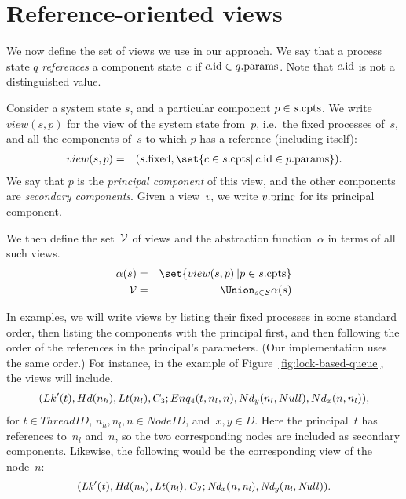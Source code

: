 \section{Reference-oriented views}
\label{sec:views}

We now define the set of views we use in our approach.  We say that a process
state $q$ \emph{references} a component state~$c$ if $c.\mathrm{id} \in q.\mathrm{params}$.
Note that $c.\mathrm{id}$ is not a distinguished value.

Consider a system state $s$, and a particular component $p \in s.\mathrm{cpts}$.  We
write $view(s, p)$ for the view of the system state from~$p$, i.e.~the
fixed processes of~$s$, and all the components of~$s$ to which $p$ has a
reference (including itself):
%
%
\begin{eqnarray*}
view(s, p) & = &
  (s.\fixed, \set{c \in s.\cpts \| c.\id \in p.\params}).
\end{eqnarray*}
%
We say that $p$ is the \emph{principal component} of this view, and the
other components are \emph{secondary components}.  Given a view~$v$, we write
$v.\mathrm{princ}$ for its principal component. 

We then define the set~$\mathcal{V}$ of views and the abstraction function~$\alpha$ in
terms of all such views.
%
\begin{eqnarray*}
\alpha(s) & = & \set{ view(s, p) \| p \in s.\cpts } \\
\V & = & \textstyle\Union_{s \in \S} \alpha(s)
\end{eqnarray*}

In examples, we will write views by listing their fixed processes in some
standard order, then listing the components with the principal first, and then
following the order of the references in the principal's parameters.  (Our
implementation uses the same order.)  For instance, in the example of
Figure~\ref{fig:lock-based-queue}, the views will include,
\[
\begin{align}
(Lk'(t), Hd(n_h), Lt(n_l), C_3; 
  Enq_4(t, n_l, n), Nd_y(n_l, Null),Nd_x(n, n_l)),
\end{align}
\]
for $t \in ThreadID$, $n_h, n_l, n \in NodeID$, and~$x, y \in D$.  Here the
principal~$t$ has references to~$n_l$ and~$n$, so the two corresponding nodes
are included as secondary components.  Likewise, the following would be the
corresponding view of the node~$n$:
\[ \it
(Lk'(t), Hd(n_h), Lt(n_l), C_3; Nd_x(n, n_l), Nd_y(n_l, Null)).
\]

